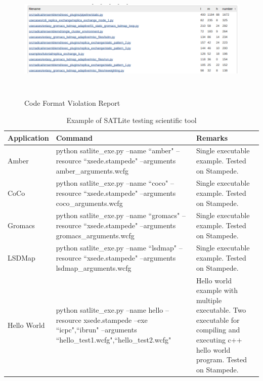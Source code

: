 \documentclass[10pt]{ruthesis}
\begin{document}
\label{}
\begin{figure}
 \begin{center}
  \includegraphics[width=17cm,height=6cm]{vio_report.png}
  \caption{Code Format Violation Report}
  \label{fig:vio_report}
  \end{center}
\end{figure}


\begin{table}
\begin{center}
\def\arraystretch{2}
\begin{tabular}{|p{2.5cm}|p{8cm}|p{5cm}|}
\hline
\rule{0pt}{5pt} \textbf{Application} & \textbf{Command} & \textbf{Remarks} \\[2ex]
\hline
Amber & python satlite\_exe.py --name ``amber" --resource ``xsede.stampede" --arguments amber\_arguments.wcfg & Single executable example. Tested on Stampede.
\\
\hline
CoCo & python satlite\_exe.py --name ``coco" --resource ``xsede.stampede" --arguments coco\_arguments.wcfg & Single executable example. Tested on Stampede.
\\
\hline
Gromacs & python satlite\_exe.py --name ``gromacs" --resource ``xsede.stampede" --arguments gromacs\_arguments.wcfg & Single executable example. Tested on Stampede.
\\
\hline
LSDMap & python satlite\_exe.py --name ``lsdmap" --resource ``xsede.stampede" --arguments lsdmap\_arguments.wcfg & Single executable example. Tested on Stampede.
\\
\hline
Hello World & python satlite\_exe.py --name hello --resource xsede.stampede --exe {``icpc",``ibrun"} --arguments {``hello\_test1.wcfg",``hello\_test2.wcfg"} & Hello world example with multiple executable. Two executable for compiling and executing c++ hello world program. Tested on Stampede.
\\
\hline
\end{tabular}
\end{center}
\caption{Example of SATLite testing scientific tool}
\label{satexample}
\end{table}
\end{document}
